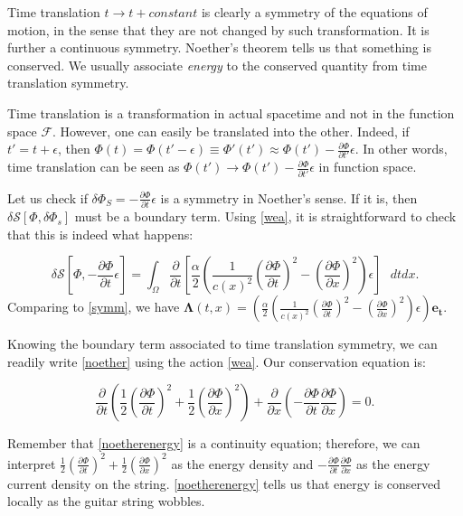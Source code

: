\documentclass{article}
\begin{document}
Time translation $t \rightarrow t+constant$ is clearly a symmetry of the equations of motion, in the sense that they are not changed by such transformation. It is further a continuous symmetry. Noether's theorem tells us that something is conserved. We usually associate \textit{energy} to the conserved quantity from time translation symmetry.

Time translation is a transformation in actual spacetime and not in the function space $\mathcal{F}$. However, one can easily be translated into the other. Indeed, if $t'=t+\epsilon$, then $\Phi(t)=\Phi(t'-\epsilon)\equiv\Phi'(t')\approx\Phi(t')-\frac{\partial \Phi}{\partial t'}\epsilon$. In other words, time translation can be seen as $\Phi(t')\rightarrow\Phi(t')-\frac{\partial \Phi}{\partial t'}\epsilon$ in function space.

Let us check if $\delta\Phi_S=-\frac{\partial \Phi}{\partial t}\epsilon$ is a symmetry in Noether's sense. If it is, then $\delta\mathcal{S}[\Phi,\delta\Phi_s]$ must be a boundary term. Using \eqref{wea}, it is straightforward to check that this is indeed what happens:

\begin{equation}\label{btwe}
\delta\mathcal{S}\left[\Phi,-\frac{\partial \Phi}{\partial t}\epsilon\right]=\int_\Omega\frac{\partial}{\partial t}\left[\frac{\alpha}{2}\left(\frac{1}{c(x)^2}\left(\frac{\partial\Phi}{\partial t}\right)^2-\left(\frac{\partial\Phi}{\partial x}\right)^2\right)\epsilon\right]\text{ }dtdx.
\end{equation}
Comparing to \eqref{symm}, we have $\bm{\Lambda}(t,x)=\left(\frac{\alpha}{2}\left(\frac{1}{c(x)^2}\left(\frac{\partial\Phi}{\partial t}\right)^2-\left(\frac{\partial\Phi}{\partial x}\right)^2\right)\epsilon\right)\bm{e_t}$.

Knowing the boundary term associated to time translation symmetry, we can readily write \eqref{noether} using the action \eqref{wea}. Our conservation equation is:

\begin{equation}\label{noetherenergy}
\boxed{\frac{\partial}{\partial t}\left(\frac{1}{2}\left(\frac{\partial\Phi}{\partial t}\right)^2+\frac{1}{2}\left(\frac{\partial\Phi}{\partial x}\right)^2\right)+\frac{\partial}{\partial x}\left(-\frac{\partial\Phi}{\partial t}\frac{\partial\Phi}{\partial x}\right)=0.}
\end{equation}

Remember that \eqref{noetherenergy} is a continuity equation; therefore, we can interpret $\frac{1}{2}\left(\frac{\partial\Phi}{\partial t}\right)^2+\frac{1}{2}\left(\frac{\partial\Phi}{\partial x}\right)^2$ as the energy density and $-\frac{\partial\Phi}{\partial t}\frac{\partial\Phi}{\partial x}$ as the energy current density on the string. \eqref{noetherenergy} tells us that energy is conserved locally as the guitar string wobbles.
\end{document}
